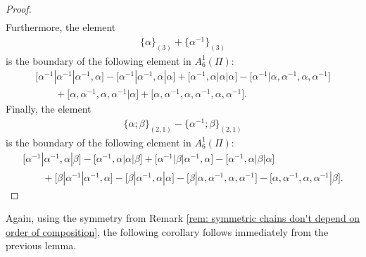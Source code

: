 \documentclass[10pt,a4paper]{amsart}
\numberwithin{equation}{section}
\begin{document}
\begin{proof}
\begin{gather*}
 \end{gather*}
 Furthermore, the element
 \begin{align*}
 \{\alpha\}_{(3)}+ \big\{\alpha^{-1}\big\}_{(3)}
 \end{align*}
 is the boundary of the following element in $A_{6}^1(\Pi)$:
 \begin{gather*}
 \big[\alpha^{-1}|\alpha^{-1}|\alpha^{-1},\alpha\big]-\big[\alpha^{-1}|\alpha^{-1},\alpha|\alpha\big]+\big[\alpha^{-1},\alpha|\alpha|\alpha\big]-\big[\alpha^{-1}|\alpha,\alpha^{-1},\alpha,\alpha^{-1}\big]\\ \qquad{}+\big[\alpha,\alpha^{-1},\alpha,\alpha^{-1}|\alpha\big] +\big[\alpha,\alpha^{-1},\alpha,\alpha^{-1},\alpha,\alpha^{-1}\big].
 \end{gather*}
 Finally, the element
 \begin{align*}
 \{\alpha;\beta\}_{(2,1)}-\big\{\alpha^{-1};\beta\big\}_{(2,1)}
 \end{align*}
 is the boundary of the following element in $A_{6}^1(\Pi)$:
 \begin{gather*}
 \big[\alpha^{-1}|\alpha^{-1},\alpha|\beta\big]-\big[\alpha^{-1},\alpha|\alpha|\beta\big]+\big[\alpha^{-1}|\beta|\alpha^{-1},\alpha\big]-\big[\alpha^{-1},\alpha|\beta|\alpha\big]\\
 \qquad{}+\big[\beta|\alpha^{-1}|\alpha^{-1},\alpha\big]-\big[\beta|\alpha^{-1},\alpha|\alpha\big]-\big[\beta|\alpha,\alpha^{-1},\alpha,\alpha^{-1}\big]-\big[\alpha,\alpha^{-1},\alpha,\alpha^{-1}|\beta\big].\tag*{\qed}
 \end{gather*}
\renewcommand{\qed}{}\end{proof}

Again, using the symmetry from Remark \ref{rem: symmetric chains don't depend on order of composition}, the following corollary follows immediately from the previous lemma.
\end{document}
